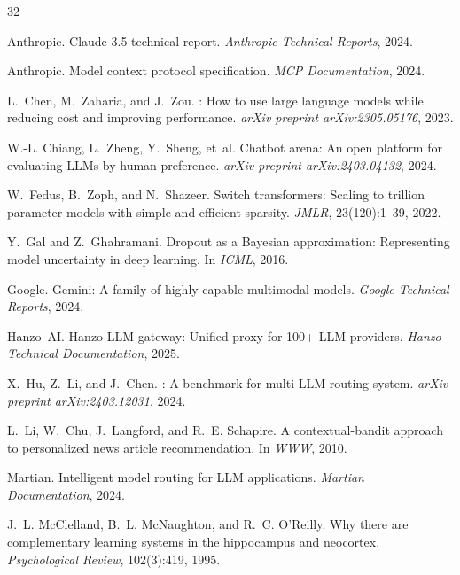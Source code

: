 \documentclass[11pt,twocolumn]{article}
\begin{document}

\begin{thebibliography}{32}

Anthropic.
\newblock Claude 3.5 technical report.
\newblock \emph{Anthropic Technical Reports}, 2024.

Anthropic.
\newblock Model context protocol specification.
\newblock \emph{MCP Documentation}, 2024.

L.~Chen, M.~Zaharia, and J.~Zou.
: How to use large language models while reducing cost and improving performance.
\newblock \emph{arXiv preprint arXiv:2305.05176}, 2023.

W.-L. Chiang, L.~Zheng, Y.~Sheng, et~al.
\newblock Chatbot arena: An open platform for evaluating {LLM}s by human preference.
\newblock \emph{arXiv preprint arXiv:2403.04132}, 2024.

W.~Fedus, B.~Zoph, and N.~Shazeer.
\newblock Switch transformers: Scaling to trillion parameter models with simple and efficient sparsity.
\newblock \emph{JMLR}, 23(120):1--39, 2022.

Y.~Gal and Z.~Ghahramani.
\newblock Dropout as a {Bayesian} approximation: Representing model uncertainty in deep learning.
\newblock In \emph{ICML}, 2016.

Google.
\newblock Gemini: A family of highly capable multimodal models.
\newblock \emph{Google Technical Reports}, 2024.

Hanzo~AI.
\newblock Hanzo {LLM} gateway: Unified proxy for 100+ {LLM} providers.
\newblock \emph{Hanzo Technical Documentation}, 2025.

X.~Hu, Z.~Li, and J.~Chen.
: A benchmark for multi-{LLM} routing system.
\newblock \emph{arXiv preprint arXiv:2403.12031}, 2024.

L.~Li, W.~Chu, J.~Langford, and R.~E. Schapire.
\newblock A contextual-bandit approach to personalized news article recommendation.
\newblock In \emph{WWW}, 2010.

Martian.
\newblock Intelligent model routing for {LLM} applications.
\newblock \emph{Martian Documentation}, 2024.

J.~L. McClelland, B.~L. McNaughton, and R.~C. O'Reilly.
\newblock Why there are complementary learning systems in the hippocampus and neocortex.
\newblock \emph{Psychological Review}, 102(3):419, 1995.


\end{thebibliography}
\end{document}
